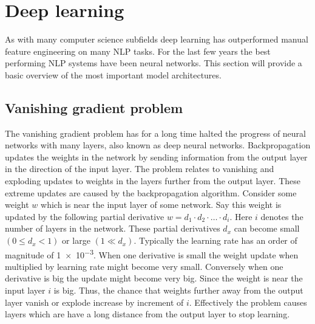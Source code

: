 \section{Deep learning}
\label{sec:deep_learning}

As with many computer science subfields deep learning has outperformed manual feature engineering on many NLP tasks.
For the last few years the best performing NLP systems have been neural networks.
This section will provide a basic overview of the most important model architectures.

\subsection{Vanishing gradient problem}
\label{subsec:vanishing_gradient_problem}
The vanishing gradient problem has for a long time halted the progress of neural networks with many layers, also known as deep neural networks.
Backpropagation updates the weights in the network by sending information from the output layer in the direction of the input layer.
The problem relates to vanishing and exploding updates to weights in the layers further from the output layer.
These extreme updates are caused by the backpropagation algorithm.
Consider some weight $w$ which is near the input layer of some network.
Say this weight is updated by the following partial derivative $w = d_1 \cdot d_2 \cdot \ldots \cdot d_i$.
Here $i$ denotes the number of layers in the network.
These partial derivatives $d_x$ can become small $(0 \leq d_x < 1)$ or large $(1 \ll d_x)$.
Typically the learning rate has an order of magnitude of \num{1e-3}.
When one derivative is small the weight update when multiplied by learning rate might become very small.
Conversely when one derivative is big the update might become very big.
Since the weight is near the input layer $i$ is big.
Thus, the chance that weights further away from the output layer vanish or explode increase by increment of $i$.
Effectively the problem causes layers which are have a long distance from the output layer to stop learning.

